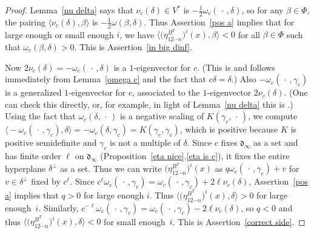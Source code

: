 \documentclass{amsart}
\theoremstyle{definition}
\theoremstyle{remark}
\numberwithin{equation}{section}
\newcommand{\br}[1]{{\langle #1 \rangle}}
\newcommand{\brr}[1]{{\bigl\langle #1 \bigr\rangle}}
\newcommand{\0}{{\mathbf{0}}}
\renewcommand{\d}{{\mathfrak d}}
\newcommand{\RSChar}{\Phi}
\newcommand{\RS}{\RSChar}
\begin{document}
\begin{proof}
Lemma~\ref{nu delta} says that $\nu_c(\delta)\in V^*$ is $-\frac12\omega_c(\,\cdot\,,\delta)$, so for any $\beta\in\RS$, the pairing $\br{\nu_c(\delta),\beta}$ is $-\frac12\omega(\beta,\delta)$.
Thus Assertion~\ref{pos a} implies that for large enough or small enough $i$, we have $\brr{\bigl(\eta_{12\cdots n}^{B^T}\bigr)^i(x),\beta}<0$ for all $\beta\in\RS$ such that $\omega_c(\beta,\delta)>0$.
This is Assertion~\ref{in big dinf}.  

Now $2\nu_c(\delta)=-\omega_c(\,\cdot\,,\delta)$ is a $1$-eigenvector for $c$.
(This is \cite[Lemma~3.5]{afforb} and follows immediately from Lemma~\ref{omega c} and the fact that $c\delta=\delta$.)
Also $-\omega_c(\,\cdot\,,\gamma_c)$ is a generalized $1$-eigenvector for $c$, associated to the $1$-eigenvector $2\nu_c(\delta)$.
(One can check this directly, or, for example, in light of Lemma~\ref{nu delta} this is \cite[Lemma~2.8]{affncA}.)
Using the fact \cite[Lemma~3.5]{afforb} that $\omega_c(\delta,\,\cdot\,)$ is a negative scaling of $K(\gamma_c,\,\cdot\,)$, we compute $\brr{-\omega_c(\,\cdot\,,\gamma_c),\delta}=-\omega_c(\delta,\gamma_c)=K(\gamma_c,\gamma_c)$, which is positive because $K$ is positive semidefinite and $\gamma_c$ is not a multiple of $\delta$.
Since $c$ fixes $\d_\infty$ as a set and has finite order $\ell$ on $\d_\infty$ (Proposition~\ref{eta nice}.\ref{eta is c}), it fixes the entire hyperplane $\delta^\perp$ as a set.
Thus we can write $\bigl(\eta_{12\cdots n}^{B^T}\bigr)^i(x)$ as $q\omega_c(\,\cdot\,,\gamma_c)+v$ for $v\in\delta^\perp$ fixed by $c^\ell$.
Since $c^\ell\omega_c(\,\cdot\,,\gamma_c)=\omega_c(\,\cdot\,,\gamma_c)+2\ell\nu_c(\delta)$, Assertion~\ref{pos a} implies that $q>0$ for large enough $i$.
Thus $\brr{\bigl(\eta_{12\cdots n}^{B^T}\bigr)^i(x),\delta}>0$ for large enough~$i$.
  Similarly, $c^{-\ell}\omega_c(\,\cdot\,,\gamma_c)=\omega_c(\,\cdot\,,\gamma_c)-2\ell\nu_c(\delta)$, so $q<0$ and thus $\brr{\bigl(\eta_{12\cdots n}^{B^T}\bigr)^i(x),\delta}<0$ for small enough~$i$.
This is Assertion~\ref{correct side}.
\end{proof}
\end{document}
